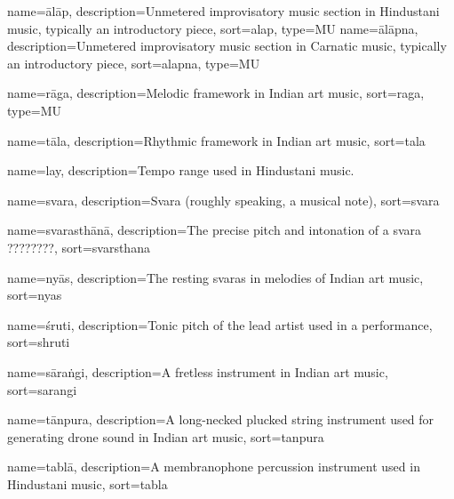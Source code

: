 

{
	name={\={a}l\={a}p},
	description={Unmetered improvisatory music section in Hindustani music, typically an introductory piece},
	sort=alap,
	type=MU
}
{
	name={\={a}l\={a}pna},
	description={Unmetered improvisatory music section in Carnatic music, typically an introductory piece},
	sort=alapna,
	type=MU	
}

{
  name={r\={a}ga},
  description={Melodic framework in Indian art music},
  sort=raga,
	type=MU  
}


{
	name={t\={a}la},
	description={Rhythmic framework in Indian art music},
	sort=tala
}

{
	name={lay},
	description={Tempo range used in Hindustani music.}
}

{
	name={svara},
	description={Svara (roughly speaking, a musical note)},
	sort=svara
}


{
	name={svarasth\={a}n\={a}},
	description={The precise pitch and intonation of a svara ????????},
	sort=svarsthana
}

{
	name={ny\={a}s},
	description={The resting svaras in melodies of Indian art music},
	sort=nyas
}

{
	name={\'sruti},
	description={Tonic pitch of the lead artist used in a performance},
	sort=shruti
}

{
	name={s\={a}ra\.{n}gi},
	description={A fretless instrument in Indian art music},
	sort=sarangi
}

{
	name={t\={a}npura},
	description={A long-necked plucked string instrument used for generating drone sound in Indian art music},
	sort=tanpura
}

{
	name={tabl\={a}},
	description={A membranophone percussion instrument used in Hindustani music},
	sort=tabla
}

	
